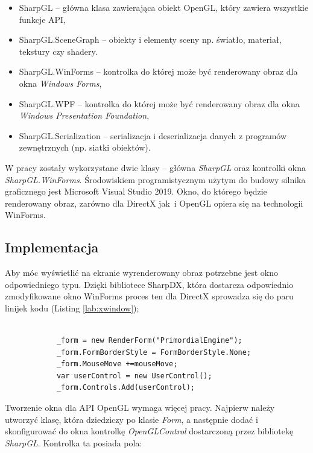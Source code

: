 \documentclass[archive]{mgr}
\begin{document}
\begin{itemize}
  \item SharpGL – główna klasa zawierająca obiekt OpenGL, który zawiera wszystkie funkcje API,
  \item SharpGL.SceneGraph – obiekty i elementy sceny np. światło, materiał, tekstury czy shadery.
  \item SharpGL.WinForms – kontrolka do której może być renderowany obraz dla okna \emph{Windows Forms},
  \item SharpGL.WPF – kontrolka do której może być renderowany obraz dla okna \emph{Windows Presentation Foundation},
  \item SharpGL.Serialization – serializacja i deserializacja danych z programów zewnętrznych (np. siatki obiektów).
\end{itemize}
W pracy zostały wykorzystane dwie klasy – główna \emph{SharpGL} oraz kontrolki okna \emph{SharpGL.\newline WinForms}.
Środowiskiem programistycznym użytym do budowy silnika graficznego jest Microsoft Visual Studio 2019. Okno, do którego będzie renderowany obraz, zarówno dla DirectX jak~i OpenGL opiera się na technologii WinForms.\

\subsection{Implementacja}

Aby móc wyświetlić na ekranie wyrenderowany obraz potrzebne jest okno odpowiedniego typu. Dzięki bibliotece SharpDX, która dostarcza odpowiednio zmodyfikowane okno WinForms proces ten dla DirectX sprowadza się do paru linijek kodu (Listing \ref{lab:xwindow});

\begin{lstlisting}[caption={Tworzenie okna dla urządzenia DirectX},captionpos=b,label={lab:xwindow}]

            _form = new RenderForm("PrimordialEngine");
            _form.FormBorderStyle = FormBorderStyle.None;
            _form.MouseMove +=mouseMove;
            var userControl = new UserControl();
            _form.Controls.Add(userControl);
\end{lstlisting}


Tworzenie okna dla API OpenGL wymaga więcej pracy. Najpierw należy utworzyć klasę, która dziedziczy po klasie \emph{Form}, a następnie dodać i skonfigurować do okna kontrolkę \emph{OpenGLControl} dostarczoną przez bibliotekę \emph{SharpGL}. Kontrolka ta posiada pola:
\end{document}
